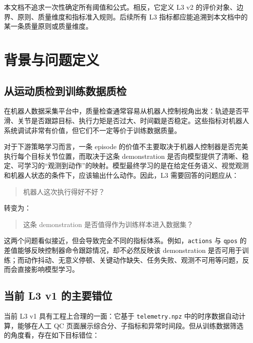 \documentclass[UTF8,zihao=-4]{ctexart}
\begin{document}
本文档不追求一次性确定所有阈值和公式。相反，它定义 L3 v2 的评价对象、边界、原则、质量维度和指标准入规则。后续所有 L3 指标都应能追溯到本文档中的某一条质量原则或质量维度。

\newpage

\section{背景与问题定义}

\subsection{从运动质检到训练数据质检}

在机器人数据采集平台中，质量检查通常容易从机器人控制视角出发：轨迹是否平滑、关节是否跟踪目标、执行力矩是否过大、时间戳是否稳定。这些指标对机器人系统调试非常有价值，但它们不一定等价于训练数据质量。

对于下游策略学习而言，一条 episode 的价值不主要取决于机器人控制器是否完美执行每个目标关节位置，而取决于这条 demonstration 是否向模型提供了清晰、稳定、可学习的“观测到动作”的映射。模型最终学习的是在给定任务语义、视觉观测和机器人状态的条件下，应该输出什么动作。因此，L3 需要回答的问题应从：

\begin{quote}
机器人这次执行得好不好？
\end{quote}

转变为：

\begin{quote}
这条 demonstration 是否值得作为训练样本进入数据集？
\end{quote}

这两个问题看似接近，但会导致完全不同的指标体系。例如，\texttt{actions} 与 \texttt{qpos} 的差值能够反映控制器命令跟踪情况，却不必然反映该 demonstration 是否可用于训练；而动作抖动、无意义停顿、关键动作缺失、任务失败、观测不可用等问题，反而会直接影响模型学习。

\subsection{当前 L3 v1 的主要错位}

当前 L3 v1 具有工程上合理的一面：它基于 \texttt{telemetry.npz} 中的时序数据自动计算，能够在人工 QC 页面展示综合分、子指标和异常时间段。但从训练数据筛选的角度看，存在如下目标错位：
\end{document}
